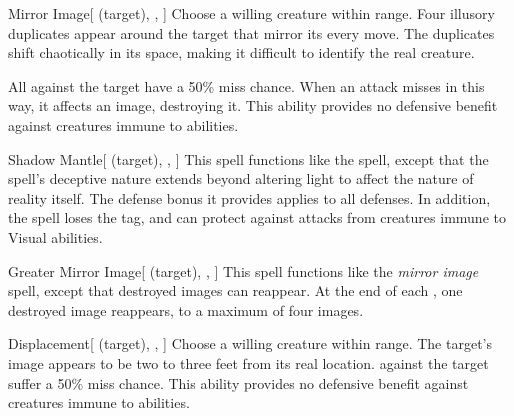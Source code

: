 \lowercase{\hypertarget{spell:Mirror Image}{}}\label{spell:Mirror Image}
\begin{attuneability}[\nth{2}]{\hypertarget{spell:Mirror Image}{Mirror Image}}[ (target), , ]
Choose a willing creature within \rngclose range.
Four illusory duplicates appear around the target that mirror its every move.
The duplicates shift chaotically in its space, making it difficult to identify the real creature.

All   against the target have a 50\% miss chance.
When an attack misses in this way, it affects an image, destroying it.
This ability provides no defensive benefit against creatures immune to  abilities.
\end{attuneability}
\vspace{0.25em}



\lowercase{\hypertarget{spell:Shadow Mantle}{}}\label{spell:Shadow Mantle}
\begin{attuneability}[\nth{3}]{\hypertarget{spell:Shadow Mantle}{Shadow Mantle}}[ (target), , ]
This spell functions like the  spell, except that the spell's deceptive nature extends beyond altering light to affect the nature of reality itself.
The defense bonus it provides applies to all defenses.
In addition, the spell loses the  tag, and can protect against attacks from creatures immune to Visual abilities.
\end{attuneability}
\vspace{0.25em}



\lowercase{\hypertarget{spell:Greater Mirror Image}{}}\label{spell:Greater Mirror Image}
\begin{attuneability}[\nth{4}]{\hypertarget{spell:Greater Mirror Image}{Greater Mirror Image}}[ (target), , ]
This spell functions like the \textit{mirror image} spell, except that destroyed images can reappear.
At the end of each , one destroyed image reappears, to a maximum of four images.
\end{attuneability}
\vspace{0.25em}



\lowercase{\hypertarget{spell:Displacement}{}}\label{spell:Displacement}
\begin{attuneability}[\nth{6}]{\hypertarget{spell:Displacement}{Displacement}}[ (target), , ]
Choose a willing creature within \rngmed range.
The target's image appears to be two to three feet from its real location.
  against the target suffer a 50\% miss chance.
This ability provides no defensive benefit against creatures immune to  abilities.
\end{attuneability}
\vspace{0.25em}



